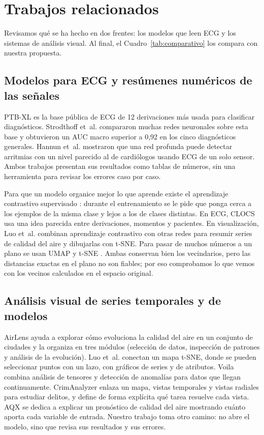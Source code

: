 \documentclass[conference]{IEEEtran}
\begin{document}
\section{Trabajos relacionados}
Revisamos qué se ha hecho en dos frentes: los modelos que leen ECG y los sistemas de análisis visual. Al final, el Cuadro~\ref{tab:comparativo} los compara con nuestra propuesta.

\subsection{Modelos para ECG y resúmenes numéricos de las señales}
PTB-XL \cite{wagner} es la base pública de ECG de 12 derivaciones más usada para clasificar diagnósticos. Strodthoff et~al. \cite{strodthoff} compararon muchas redes neuronales sobre esta base y obtuvieron un AUC macro superior a 0,92 en los cinco diagnósticos generales. Hannun et~al. \cite{hannun} mostraron que una red profunda puede detectar arritmias con un nivel parecido al de cardiólogos usando ECG de un solo sensor. Ambos trabajos presentan sus resultados como tablas de números, sin una herramienta para revisar los errores caso por caso.

Para que un modelo organice mejor lo que aprende existe el aprendizaje contrastivo supervisado \cite{khosla}: durante el entrenamiento se le pide que ponga cerca a los ejemplos de la misma clase y lejos a los de clases distintas. En ECG, CLOCS \cite{kiyasseh} usa una idea parecida entre derivaciones, momentos y pacientes. En visualización, Luo et~al. \cite{luo} combinan aprendizaje contrastivo con otras redes para resumir series de calidad del aire y dibujarlas con t-SNE. Para pasar de muchos números a un plano se usan UMAP \cite{mcinnes} y t-SNE \cite{vandermaaten}. Ambas conservan bien los vecindarios, pero las distancias exactas en el plano no son fiables; por eso comprobamos lo que vemos con los vecinos calculados en el espacio original.

\subsection{Análisis visual de series temporales y de modelos}
AirLens \cite{qu} ayuda a explorar cómo evoluciona la calidad del aire en un conjunto de ciudades y la organiza en tres módulos (selección de datos, inspección de patrones y análisis de la evolución). Luo et~al. \cite{luo} conectan un mapa t-SNE, donde se pueden seleccionar puntos con un lazo, con gráficos de series y de atributos. Voila \cite{cao} combina análisis de tensores y detección de anomalías para datos que llegan continuamente. CrimAnalyzer \cite{alvarenga} enlaza un mapa, vistas temporales y vistas radiales para estudiar delitos, y define de forma explícita qué tarea resuelve cada vista. AQX \cite{velumani} se dedica a explicar un pronóstico de calidad del aire mostrando cuánto aporta cada variable de entrada. Nuestro trabajo toma otro camino: no abre el modelo, sino que revisa sus resultados y sus errores.
\end{document}
